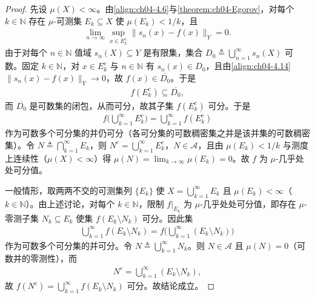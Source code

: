 \documentclass[../../main.tex]{subfiles}%
\begin{document}
\begin{proof}
先设 $\mu(X)<\infty$。由\eqref{align:ch04-4.6}与\cref{theorem:ch04-Egorov}，对每个 $k\in\mathbb{N}$ 存在 $\mu$-可测集 $E_k\subseteq X$ 使 $\mu(E_k)<1/k$，且
\begin{align}
\lim_{n\to\infty}\sup_{x\in E_k^c}\|s_n(x)-f(x)\|_Y=0. \label{align:ch04-4.14}
\end{align}
由于对每个 $n\in\mathbb{N}$ 值域 $s_n(X)\subseteq Y$ 是有限集，集合 $D_0\triangleq\bigcup_{n=1}^\infty s_n(X)$ 可数。固定 $k\in\mathbb{N}$，对 $x\in E_k^c$ 与 $n\in\mathbb{N}$ 有 $s_n(x)\in D_0$，且由\eqref{align:ch04-4.14} $\|s_n(x)-f(x)\|_Y\to0$，故 $f(x)\in\overline{D_0}$。于是
\begin{align*}
f(E_k^c)\subseteq\overline{D_0},
\end{align*}
而 $\overline{D_0}$ 是可数集的闭包，从而可分，故其子集 $f(E_k^c)$ 可分。于是
\begin{align*}
f\Big(\bigcup_{k=1}^\infty E_k^c\Big)=\bigcup_{k=1}^\infty f(E_k^c)
\end{align*}
作为可数多个可分集的并仍可分（各可分集的可数稠密集之并是该并集的可数稠密集）。令 $N\triangleq\bigcap_{k=1}^\infty E_k$，则 $N^c=\bigcup_{k=1}^\infty E_k^c$，$N\in\mathcal{A}$，且由 $\mu(E_k)<1/k$ 与测度上连续性（$\mu(X)<\infty$）得 $\mu(N)=\lim_{k\to\infty}\mu(E_k)=0$。故 $f$ 为 $\mu$-几乎处处可分值。

一般情形，取两两不交的可测集列 $\{E_k\}$ 使 $X=\bigcup_{k=1}^\infty E_k$ 且 $\mu(E_k)<\infty$（$k\in\mathbb{N}$）。由上述讨论，对每个 $k\in\mathbb{N}$，限制 $f|_{E_k}$ 为 $\mu$-几乎处处可分值，即存在 $\mu$-零测子集 $N_k\subseteq E_k$ 使集 $f(E_k\setminus N_k)$ 可分。因此集
\begin{align*}
\bigcup_{k=1}^\infty f(E_k\setminus N_k)=f\Big(\bigcup_{k=1}^\infty(E_k\setminus N_k)\Big)
\end{align*}
作为可数多个可分集的并可分。令 $N\triangleq\bigcup_{k=1}^\infty N_k$。则 $N\in\mathcal{A}$ 且 $\mu(N)=0$（可数并的零测性），而
\begin{align*}
N^c=\bigcup_{k=1}^\infty(E_k\setminus N_k),
\end{align*}
故 $f(N^c)=\bigcup_{k=1}^\infty f(E_k\setminus N_k)$ 可分。故结论成立。
\end{proof}
\end{document}
